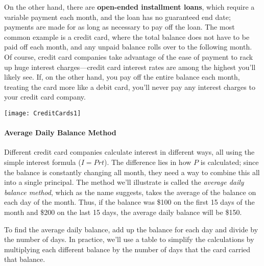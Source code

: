 On the other hand, there are \textbf{open-ended installment loans}, which require a variable payment each month, and the loan has no guaranteed end date; payments are made for as long as necessary to pay off the loan.  The most common example is a credit card, where the total balance does not have to be paid off each month, and any unpaid balance rolls over to the following month.  Of course, credit card companies take advantage of the ease of payment to rack up huge interest charges---credit card interest rates are among the highest you'll likely see.  If, on the other hand, you pay off the entire balance each month, treating the card more like a debit card, you'll never pay any interest charges to your credit card company.
\begin{center}
\texttt{[image: CreditCards1]}
\end{center}
\vfill
\pagebreak

\paragraph{Average Daily Balance Method} Different credit card companies calculate interest in different ways, all using the simple interest formula ($I=Prt$).  The difference lies in how $P$ is calculated; since the balance is constantly changing all month, they need a way to combine this all into a single principal.  The method we'll illustrate is called the \textit{average daily balance method}, which as the name suggests, takes the average of the balance on each day of the month.  Thus, if the balance was \$100 on the first 15 days of the month and \$200 on the last 15 days, the average daily balance will be \$150.

To find the average daily balance, add up the balance for each day and divide by the number of days.  In practice, we'll use a table to simplify the calculations by multiplying each different balance by the number of days that the card carried that balance.

